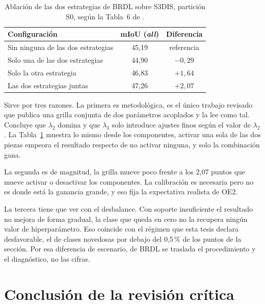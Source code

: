 \begin{table}[!htbp]
\centering
{}\small
\caption[Ablación de BRDL en S3DIS]{Ablación de las dos estrategias de BRDL sobre S3DIS, partición S0,
según la Tabla~6 de \cite{su2025brdl}.}
\label{tab:ablacion-brdl}
\begin{tabularx}{\linewidth}{@{}>{\raggedright\arraybackslash\hsize=1.00\hsize}Xcc@{}}
\hline
Configuración & mIoU (\emph{all}) & Diferencia \\
\hline
Sin ninguna de las dos estrategias & 45,19 & referencia \\
Solo una de las dos estrategias & 44,90 & $-0{,}29$ \\
Solo la otra estrategia & 46,83 & $+1{,}64$ \\
Las dos estrategias juntas & 47,26 & $+2{,}07$ \\
\hline
\end{tabularx}
\end{table}

Sirve por tres razones. La primera es metodológica, es el único trabajo revisado
que publica una grilla conjunta de dos parámetros acoplados y la lee como tal.
Concluye que $\lambda_2$ domina y que $\lambda_3$ solo introduce ajustes finos
según el valor de $\lambda_2$. La Tabla~\ref{tab:ablacion-brdl} muestra lo mismo
desde los componentes, activar una sola de las dos piezas empeora el resultado
respecto de no activar ninguna, y solo la combinación gana.

La segunda es de magnitud, la grilla mueve poco frente a los 2,07 puntos que
mueve activar o desactivar los componentes. La calibración es necesaria pero no es donde
está la ganancia grande, y eso fija la expectativa realista de OE2.

La tercera tiene que ver con el desbalance. Con soporte insuficiente el resultado
no mejora de forma gradual, la clase que queda en cero no la recupera ningún valor
de hiperparámetro. Eso coincide con el régimen que esta tesis declara
desfavorable, el de clases novedosas por debajo del 0,5\,\% de los puntos de la
sección. Por esa diferencia de escenario, de BRDL se traslada el procedimiento y
el diagnóstico, no las cifras.

\section[Conclusión, aportes del proyecto]{Conclusión de la revisión crítica}
\label{sec:aporte}


